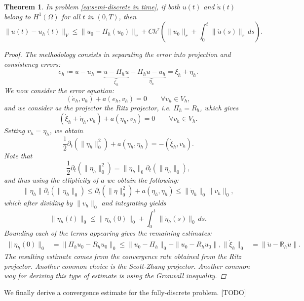 \documentclass{article}
\newcommand{\R}{\mathbb{R}}
\newtheorem{theorem}{Theorem}
\begin{document}
\begin{theorem}
In problem \eqref{eq:semi-discrete in time}, if both $u(t)$ and $\dot u(t)$ belong to $H^1(\Omega)$ for all $t$ in $(0,T)$, then 
    $$ \| u(t) - u_h(t) \|_V \leq \|u_0 - \Pi_h(u_0)\|_v + Ch^r\left(\|u_0\|_r+\int_0^t\|\dot u(s)\|_r\,ds\right). $$
\begin{proof}
The methodology consists in separating the error into \emph{projection} and \emph{consistency} errors: 
    $$ e_h \coloneqq u - u_h = \underbrace{u - \Pi_h u}_{\xi_h} + \underbrace{\Pi_h u - u_h}_{\eta_h} = \xi_h + \eta_h. $$
We now consider the error equation: 
    $$ (\dot e_h, v_h) + a(e_h, v_h) = 0 \qquad \forall v_h\in V_h, $$
and we consider as the projector the Ritz projector, i.e. $\Pi_h=R_h$, which gives
    $$ (\dot \xi_h + \dot \eta_h, v_h) + a(\eta_h, v_h) = 0 \qquad \forall v_h\in V_h. $$
Setting $v_h = \eta_h$, we obtain 
    $$ \frac 1 2 \partial_t(\|\eta_h\|^2_0)+a(\eta_h,\eta_h) = -(\dot \xi_h, v_h). $$
Note that 
    $$ \frac 1 2 \partial_t(\|\eta_h\|_0^2) = \|\eta_h\|_0 \partial_t(\|\eta_h\|_0), $$
and thus using the ellipticity of $a$ we obtain the following: 
    $$ \|\eta_h\|\partial_t(\|\eta_h\|_0) \leq \partial_t(\|\eta\|_0^2) + a(\eta_h, \eta_h) \leq \|\dot \eta_h\|_0 \|v_h\|_0, $$
which after dividing by $\|v_h\|_0$ and integrating yields
    $$ \| \eta_h(t)\|_0 \leq \|\eta_h(0)\|_0 + \int_0^t \| \dot \eta_h(s) \|_0\,ds. $$
Bounding each of the terms appearing gives the remaining estimates: 
    \begin{align*}
        \| \eta_h(0) \|_0 &= \|\Pi_h u_0 - R_h u_0 \|_0 \leq \|u_0 - \Pi_h\|_0 + \| u_0 - R_h u_0\|, 
        \| \dot \xi_h \|_0 &= \| \dot u - \R_h \dot u \|.
    \end{align*}
The resulting estimate comes from the convergence rate obtained from the Ritz projector. Another common choice is the Scott-Zhang projector. Another common way for deriving this type of estimate is using the Gronwall inequality.
\end{proof}
\end{theorem}
We finally derive a convergence estimate for the fully-discrete problem. [TODO]



\end{document}
